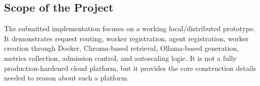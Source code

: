 \subsection{Scope of the Project}
The submitted implementation focuses on a working local/distributed prototype. It demonstrates request routing, worker registration, agent registration, worker creation through Docker, Chroma-based retrieval, Ollama-based generation, metrics collection, admission control, and autoscaling logic. It is not a fully production-hardened cloud platform, but it provides the core construction details needed to reason about such a platform.
